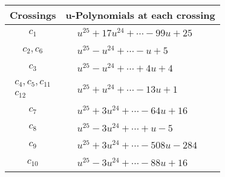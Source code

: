 \documentclass[1p]{elsarticle_modified}
\theoremstyle{definition}
\begin{document}
\begin{tabular}{m{50pt}|m{274pt}}
Crossings & \hspace{64pt}u-Polynomials at each crossing \\
\hline $$\begin{aligned}c_{1}\end{aligned}$$&$\begin{aligned}
&u^{25}+17 u^{24}+\cdots-99 u+25
\end{aligned}$\\
\hline $$\begin{aligned}c_{2},c_{6}\end{aligned}$$&$\begin{aligned}
&u^{25}- u^{24}+\cdots- u+5
\end{aligned}$\\
\hline $$\begin{aligned}c_{3}\end{aligned}$$&$\begin{aligned}
&u^{25}- u^{24}+\cdots+4 u+4
\end{aligned}$\\
\hline $$\begin{aligned}c_{4},c_{5},c_{11}\\c_{12}\end{aligned}$$&$\begin{aligned}
&u^{25}+u^{24}+\cdots-13 u+1
\end{aligned}$\\
\hline $$\begin{aligned}c_{7}\end{aligned}$$&$\begin{aligned}
&u^{25}+3 u^{24}+\cdots-64 u+16
\end{aligned}$\\
\hline $$\begin{aligned}c_{8}\end{aligned}$$&$\begin{aligned}
&u^{25}-3 u^{24}+\cdots+u-5
\end{aligned}$\\
\hline $$\begin{aligned}c_{9}\end{aligned}$$&$\begin{aligned}
&u^{25}+3 u^{24}+\cdots-508 u-284
\end{aligned}$\\
\hline $$\begin{aligned}c_{10}\end{aligned}$$&$\begin{aligned}
&u^{25}-3 u^{24}+\cdots-88 u+16
\end{aligned}$\\
\hline
\end{tabular}\\~\\
\end{document}
